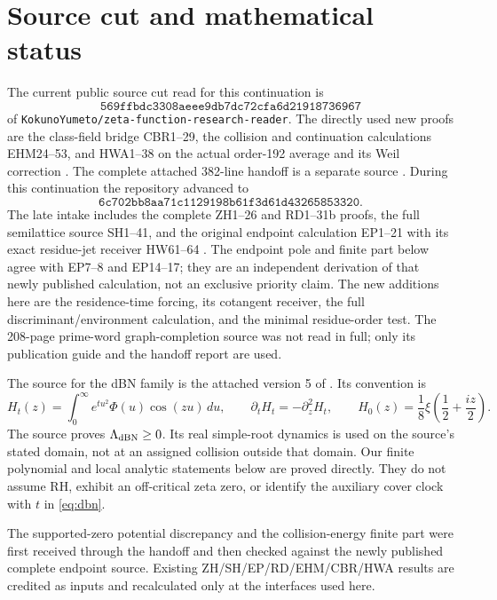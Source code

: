 \documentclass[11pt,a4paper]{article}
\theoremstyle{definition}
\begin{document}
\section{Source cut and mathematical status}
The current public source cut read for this continuation is
\[
\texttt{569ffbdc3308aeee9db7dc72cfa6d21918736967}
\]
of \texttt{KokunoYumeto/zeta-function-research-reader}. The directly used new proofs are the class-field bridge CBR1--29, the collision and continuation calculations EHM24--53, and HWA1--38 on the actual order-192 average and its Weil correction \citep{CBR,EHM,HWA}. The complete attached 382-line handoff is a separate source \citep{handoff}. During this continuation the repository advanced to
\[
\texttt{6c702bb8aa71c1129198b61f3d61d43265853320}.
\]
The late intake includes the complete ZH1--26 and RD1--31b proofs, the full semilattice source SH1--41, and the original endpoint calculation EP1--21 with its exact residue-jet receiver HW61--64 \citep{ZH,RD,SH,EP}. The endpoint pole and finite part below agree with EP7--8 and EP14--17; they are an independent derivation of that newly published calculation, not an exclusive priority claim. The new additions here are the residence-time forcing, its cotangent receiver, the full discriminant/environment calculation, and the minimal residue-order test. The 208-page prime-word graph-completion source was not read in full; only its publication guide and the handoff report are used.

The source for the dBN family is the attached version 5 of \citet{RT}. Its convention is
\begin{equation}\label{eq:dbn}
 H_t(z)=\int_0^\infty e^{tu^2}\Phi(u)\cos(zu)\,du,
 \qquad \partial_tH_t=-\partial_z^2H_t,
 \qquad H_0(z)=\frac18\xi\left(\frac12+\frac{iz}{2}\right).
\end{equation}
The source proves $\Lambda_{\rm dBN}\ge0$. Its real simple-root dynamics is used on the source's stated domain, not at an assigned collision outside that domain. Our finite polynomial and local analytic statements below are proved directly. They do not assume RH, exhibit an off-critical zeta zero, or identify the auxiliary cover clock with $t$ in \eqref{eq:dbn}.

The supported-zero potential discrepancy and the collision-energy finite part were first received through the handoff and then checked against the newly published complete endpoint source. Existing ZH/SH/EP/RD/EHM/CBR/HWA results are credited as inputs and recalculated only at the interfaces used here.
\end{document}
